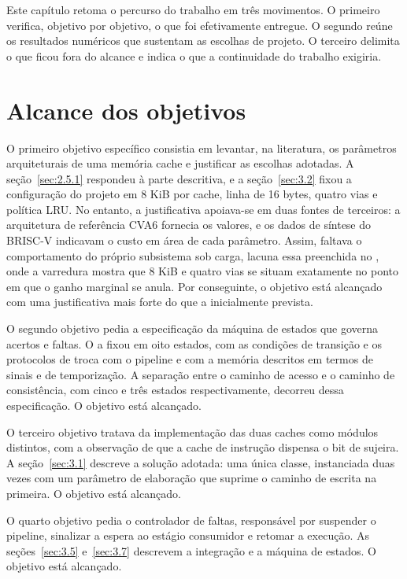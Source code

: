 Este capítulo retoma o percurso do trabalho em três movimentos. O primeiro verifica, objetivo por objetivo, o que foi efetivamente entregue. O segundo reúne os resultados numéricos que sustentam as escolhas de projeto. O terceiro delimita o que ficou fora do alcance e indica o que a continuidade do trabalho exigiria.

\section{Alcance dos objetivos}\label{sec:5.1}

O primeiro objetivo específico consistia em levantar, na literatura, os parâmetros arquiteturais de uma memória cache e justificar as escolhas adotadas. A seção~\ref{sec:2.5.1} respondeu à parte descritiva, e a seção~\ref{sec:3.2} fixou a configuração do projeto em 8 KiB por cache, linha de 16 bytes, quatro vias e política LRU. No entanto, a justificativa apoiava-se em duas fontes de terceiros: a arquitetura de referência CVA6 fornecia os valores, e os dados de síntese do BRISC-V indicavam o custo em área de cada parâmetro. Assim, faltava o comportamento do próprio subsistema sob carga, lacuna essa preenchida no , onde a varredura mostra que 8 KiB e quatro vias se situam exatamente no ponto em que o ganho marginal se anula. Por conseguinte, o objetivo está alcançado com uma justificativa mais forte do que a inicialmente prevista.

O segundo objetivo pedia a especificação da máquina de estados que governa acertos e faltas. O  a fixou em oito estados, com as condições de transição e os protocolos de troca com o pipeline e com a memória descritos em termos de sinais e de temporização. A separação entre o caminho de acesso e o caminho de consistência, com cinco e três estados respectivamente, decorreu dessa especificação. O objetivo está alcançado.

O terceiro objetivo tratava da implementação das duas caches como módulos distintos, com a observação de que a cache de instrução dispensa o bit de sujeira. A seção~\ref{sec:3.1} descreve a solução adotada: uma única classe, instanciada duas vezes com um parâmetro de elaboração que suprime o caminho de escrita na primeira. O objetivo está alcançado.

O quarto objetivo pedia o controlador de faltas, responsável por suspender o pipeline, sinalizar a espera ao estágio consumidor e retomar a execução. As seções~\ref{sec:3.5} e~\ref{sec:3.7} descrevem a integração e a máquina de estados. O objetivo está alcançado.

